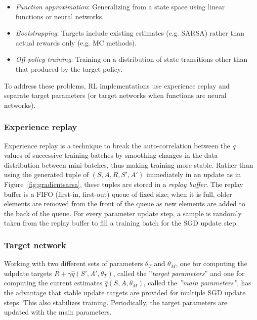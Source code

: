 \begin{itemize}
\item \emph{Function approximation}: Generalizing from a state space using linear functions or neural networks.
\item \emph{Bootstrapping}: Targets include existing estimates (e.g. SARSA) rather than actual rewards only (e.g. MC methods).
\item \emph{Off-policy training}: Training on a distribution of state transitions other than that produced by the target policy.
\end{itemize}

To address these problems, RL implementations use experience replay and separate target parameters (or target networks when functions are neural networks). 

\subsubsection*{Experience replay} 

Experience replay is a technique to break the auto-correlation between the $q$ values of successive training batches by smoothing changes in the data distribution between mini-batches, thus making training more stable. Rather than using the generated tuple of $(S, A, R, S', A')$ immediately in an update as in Figure~\ref{fig:gradientsarsa}, these tuples are stored in a \emph{replay buffer}. The replay buffer is a FIFO (first-in, first-out) queue of fixed size; when it is full, older elements are removed from the front of the queue as new elements are added to the back of the queue. For every parameter update step, a sample is randomly taken from the replay buffer to fill a training batch for the SGD update step. 

\subsubsection*{Target network}

Working with two different sets of parameters $\theta_T$ and $\theta_M$, one for computing the udpdate targets $R + \gamma \hat{q}(S', A', \theta_T)$, called the ''\emph{target parameters}'' and one for computing the current estimates $\hat{q}(S, A, \theta_M)$, called the \emph{''main parameters''}, has the advantage that stable update targets are provided for multiple SGD update steps. This also stabilizes training. Periodically, the target parameters are updated with the main parameters.

